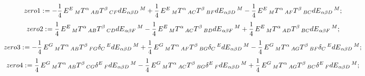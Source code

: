 \documentclass[11pt]{article}
\def\specialcolon{\mathrel{\mathop{:}}\hspace{-.5em}}
\begin{document}
\begin{dmath*}[compact, spread=2pt]
zero1\specialcolon{}=  - \frac{1}{4}\, {E}^{E}\,_{M} {T}^{\alpha}\,_{A B} {T}^{\beta}\,_{C F} {dE}_{\alpha \beta D}\,^{M} + \frac{1}{4}\, {E}^{E}\,_{M} {T}^{\alpha}\,_{A C} {T}^{\beta}\,_{B F} {dE}_{\alpha \beta D}\,^{M} - \frac{1}{4}\, {E}^{E}\,_{M} {T}^{\alpha}\,_{A F} {T}^{\beta}\,_{B C} {dE}_{\alpha \beta D}\,^{M};
\end{dmath*}
\begin{dmath*}[compact, spread=2pt]
zero2\specialcolon{}= \frac{1}{4}\, {E}^{E}\,_{M} {T}^{\alpha}\,_{A B} {T}^{\beta}\,_{C D} {dE}_{\alpha \beta F}\,^{M} - \frac{1}{4}\, {E}^{E}\,_{M} {T}^{\alpha}\,_{A C} {T}^{\beta}\,_{B D} {dE}_{\alpha \beta F}\,^{M} + \frac{1}{4}\, {E}^{E}\,_{M} {T}^{\alpha}\,_{A D} {T}^{\beta}\,_{B C} {dE}_{\alpha \beta F}\,^{M};
\end{dmath*}
\begin{dmath*}[compact, spread=2pt]
zero3\specialcolon{}=  - \frac{1}{4}\, {E}^{G}\,_{M} {T}^{\alpha}\,_{A B} {T}^{\beta}\,_{F G} {\delta}_{C}\,^{E} {dE}_{\alpha \beta D}\,^{M} + \frac{1}{4}\, {E}^{G}\,_{M} {T}^{\alpha}\,_{A F} {T}^{\beta}\,_{B G} {\delta}_{C}\,^{E} {dE}_{\alpha \beta D}\,^{M} - \frac{1}{4}\, {E}^{G}\,_{M} {T}^{\alpha}\,_{A G} {T}^{\beta}\,_{B F} {\delta}_{C}\,^{E} {dE}_{\alpha \beta D}\,^{M};
\end{dmath*}
\begin{dmath*}[compact, spread=2pt]
zero4\specialcolon{}= \frac{1}{4}\, {E}^{G}\,_{M} {T}^{\alpha}\,_{A B} {T}^{\beta}\,_{C G} {\delta}^{E}\,_{F} {dE}_{\alpha \beta D}\,^{M} - \frac{1}{4}\, {E}^{G}\,_{M} {T}^{\alpha}\,_{A C} {T}^{\beta}\,_{B G} {\delta}^{E}\,_{F} {dE}_{\alpha \beta D}\,^{M} + \frac{1}{4}\, {E}^{G}\,_{M} {T}^{\alpha}\,_{A G} {T}^{\beta}\,_{B C} {\delta}^{E}\,_{F} {dE}_{\alpha \beta D}\,^{M};
\end{dmath*}
\end{document}
